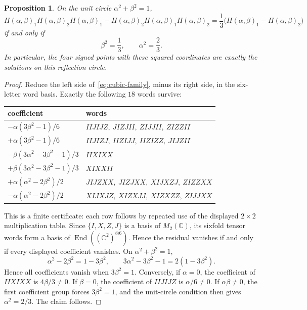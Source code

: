 \documentclass[11pt]{article}
\newtheorem{proposition}[theorem]{Proposition}
\theoremstyle{remark}
\newcommand{\End}{\operatorname{End}}
\newcommand{\bbC}{\mathbb C}
\begin{document}
\begin{proposition}\label{prop:circle}
On the unit circle \(\alpha^2+\beta^2=1\),
\begin{equation}
  H(\alpha,\beta)_1H(\alpha,\beta)_2H(\alpha,\beta)_1
  -
  H(\alpha,\beta)_2H(\alpha,\beta)_1H(\alpha,\beta)_2
  =
  \frac13\bigl(H(\alpha,\beta)_1-H(\alpha,\beta)_2\bigr)
  \label{eq:cubic-family}
\end{equation}
if and only if
\[
  \beta^2=\frac13,\qquad\alpha^2=\frac23.
\]
In particular, the four signed points with these squared coordinates are
exactly the solutions on this reflection circle.
\end{proposition}

\begin{proof}
Reduce the left side of~\eqref{eq:cubic-family}, minus its right side, in
the six-letter word basis.  Exactly the following \(18\) words survive:
\begin{center}
\small
\renewcommand{\arraystretch}{1.16}
\begin{tabular}{>{\raggedright\arraybackslash}p{}
                >{\raggedright\arraybackslash}p{}}
\toprule
coefficient & words\\
\midrule
\(-\alpha(3\beta^2-1)/6\) &
\(IIJIJZ,\ JIZJII,\ ZIJJII,\ ZIZZII\)\\
\(+\alpha(3\beta^2-1)/6\) &
\(IIJIZJ,\ IIZIJJ,\ IIZIZZ,\ JIJZII\)\\
\(-\beta(3\alpha^2-3\beta^2-1)/3\) &
\(IIXIXX\)\\
\(+\beta(3\alpha^2-3\beta^2-1)/3\) &
\(XIXXII\)\\
\(+\alpha(\alpha^2-2\beta^2)/2\) &
\(JIJZXX,\ JIZJXX,\ XIJXZJ,\ ZIZZXX\)\\
\(-\alpha(\alpha^2-2\beta^2)/2\) &
\(XIJXJZ,\ XIZXJJ,\ XIZXZZ,\ ZIJJXX\)\\
\bottomrule
\end{tabular}
\end{center}
This is a finite certificate: each row follows by repeated use of the
displayed \(2\times2\) multiplication table.  Since \(\{I,X,Z,J\}\) is a
basis of \(M_2(\bbC)\), its sixfold tensor words form a basis of
\(\End((\bbC^2)^{\otimes6})\).  Hence the residual vanishes if and only if
every displayed coefficient vanishes.  On
\(\alpha^2+\beta^2=1\),
\[
  \alpha^2-2\beta^2=1-3\beta^2,\qquad
  3\alpha^2-3\beta^2-1=2(1-3\beta^2).
\]
Hence all coefficients vanish when \(3\beta^2=1\).  Conversely, if
\(\alpha=0\), the coefficient of \(IIXIXX\) is
\(4\beta/3\ne0\).  If \(\beta=0\), the coefficient of \(IIJIJZ\) is
\(\alpha/6\ne0\).  If \(\alpha\beta\ne0\), the first coefficient group forces
\(3\beta^2=1\), and the unit-circle condition then gives
\(\alpha^2=2/3\).  The claim follows.
\end{proof}
\end{document}
